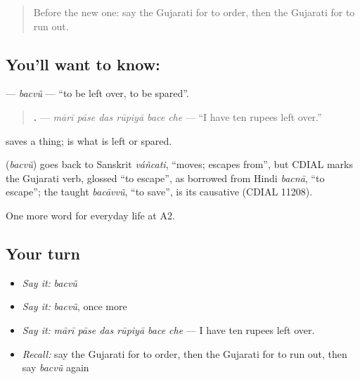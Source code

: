 \label{lesson:GU-C189-bacvu}



\begin{quote}
Before the new one: say the Gujarati for to order, then the Gujarati for to run out.
\end{quote}

\subsection*{You'll want to know: }
\textbf{} — \emph{bacvũ} — \textquotedblleft{}to be left over, to be spared\textquotedblright{}.

\begin{quote}
\textbf{     .} — \emph{mārī pāse das rūpiyā bace che} — \textquotedblleft{}I have ten rupees left over.\textquotedblright{}
\end{quote}

\textbf{} saves a thing; \textbf{} is what is left or spared.

\begin{cousinweb}
\textbf{} (\emph{bacvũ}) goes back to Sanskrit \emph{váñcati}, \textquotedblleft{}moves; escapes from\textquotedblright{}, but CDIAL marks the Gujarati verb, glossed \textquotedblleft{}to escape\textquotedblright{}, as borrowed from Hindi \emph{bacnā}, \textquotedblleft{}to escape\textquotedblright{}; the taught \emph{bacāvvũ}, \textquotedblleft{}to save\textquotedblright{}, is its causative (CDIAL 11208).
\end{cousinweb}

\begin{grammarlens}[title={What you've built}]
One more word for everyday life at A2.
\end{grammarlens}

\subsection*{Your turn}
\begin{itemize}
\raggedright
  \item \emph{Say it:} \emph{bacvũ}
  \item \emph{Say it:} \emph{bacvũ}, once more
  \item \emph{Say it:} \emph{mārī pāse das rūpiyā bace che} — I have ten rupees left over.
  \item \emph{Recall:} say the Gujarati for to order, then the Gujarati for to run out, then say \emph{bacvũ} again
\end{itemize}

